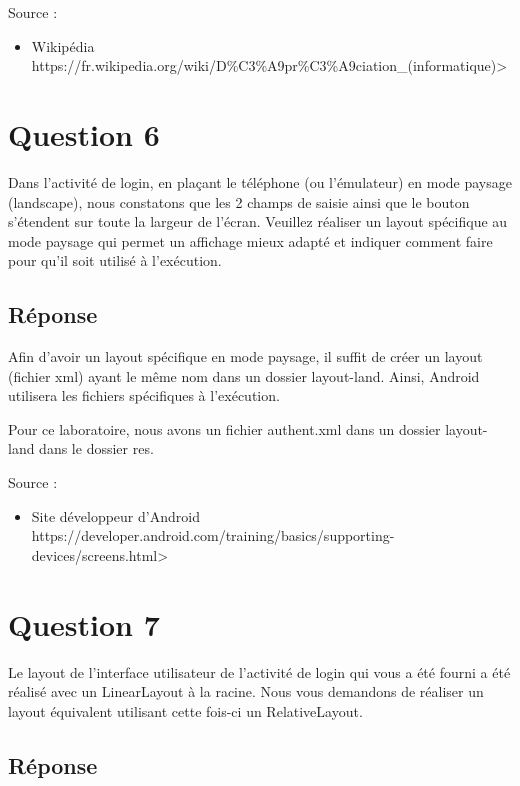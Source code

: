 \documentclass[francais,12pt]{article}
\begin{document}
		Source :
		\begin{itemize}
			\item Wikipédia \newline https://fr.wikipedia.org/wiki/D\%C3\%A9pr\%C3\%A9ciation\_(informatique)>
		\end{itemize}
	
		
	\section*{Question 6}
		Dans l'activité de login, en plaçant le téléphone (ou l'émulateur) en mode paysage (landscape), nous constatons que les 2 champs de saisie ainsi que le bouton s'étendent sur toute la largeur de l'écran. Veuillez réaliser un layout spécifique au mode paysage qui permet un affichage mieux adapté et indiquer comment faire pour qu’il soit utilisé à l’exécution.  
		
		\subsection*{Réponse}
        Afin d'avoir un layout spécifique en mode paysage, il suffit de créer un layout (fichier xml) ayant le même nom dans un dossier layout-land. Ainsi, Android utilisera les fichiers spécifiques à l'exécution.
        
        Pour ce laboratoire, nous avons un fichier authent.xml dans un dossier layout-land dans le dossier res.
		
		Source :
    	\begin{itemize}
            \item Site développeur d'Android \newline
             https://developer.android.com/training/basics/supporting-devices/screens.html>
        \end{itemize}
		
	\section*{Question 7}
		Le layout de l’interface utilisateur de l’activité de login qui vous a été fourni a été réalisé avec un LinearLayout à la racine. Nous vous demandons de réaliser un layout équivalent utilisant cette fois-ci un RelativeLayout.  
		
		\subsection*{Réponse}
		
\end{document}
